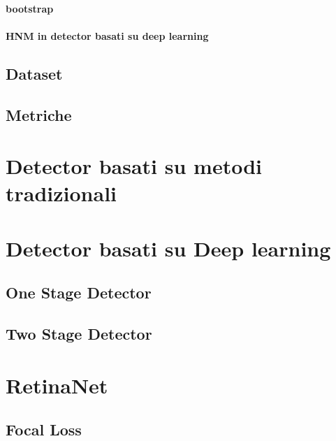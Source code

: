\paragraph{bootstrap}
\paragraph{HNM in detector basati su deep learning}
\subsection{Dataset}
\subsection{Metriche}
\section{Detector basati su metodi tradizionali}
\label{sec:traditional_method}
\section{Detector basati su Deep learning}
\label{sec:deep_learning_obj}
\subsection{One Stage Detector}
\label{subsec:one_stage_detector}
\subsection{Two Stage Detector}
\label{subsec:two_stage_detector}

\section{RetinaNet}
\subsection{Focal Loss}